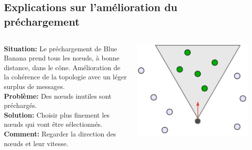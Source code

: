 \documentclass{beamer}
\begin{document}
  \subsection{Explications sur l'amélioration du préchargement}
  \begin{frame}
	\begin{columns}
        \begin{column}{7cm}
	\textbf{Situation:} Le préchargement de Blue Banana prend tous les nœuds, à bonne distance, dans le cône. Amélioration de la cohérence de la topologie avec un léger surplus de messages.\\
	\vspace{5mm}
	\textbf{Problème:} Des nœuds inutiles sont préchargés.\\
	\vspace{5mm}
	\textbf{Solution:} Choisir plus finement les nœuds qui vont être sélectionnés.\\
	\vspace{5mm}
	\textbf{Comment:} Regarder la direction des nœuds et leur vitesse.\\
         \end{column}
         \begin{column}{3cm}
          \includegraphics[scale=0.1]{./Ressources/Images/prefetchNormal.png}\\
         \end{column}
        \end{columns}
  \end{frame}
\end{document}
